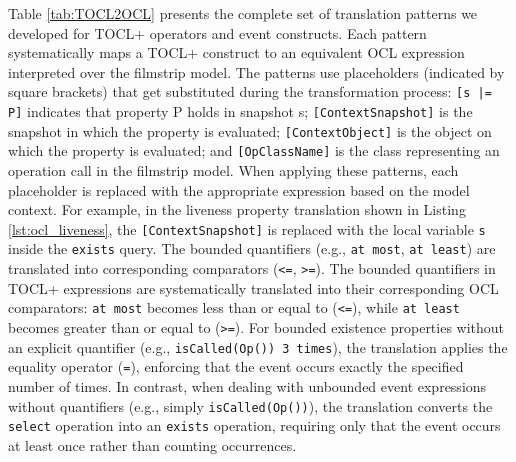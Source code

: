 Table \ref{tab:TOCL2OCL} presents the complete set of translation patterns we 
developed for TOCL+ operators and event constructs. Each pattern systematically 
maps a TOCL+ construct to an equivalent OCL expression interpreted over the filmstrip 
model. The patterns use placeholders (indicated by square brackets) that get 
substituted during the transformation process: \texttt{[s |= P]} indicates that 
property P holds in snapshot s; \texttt{[ContextSnapshot]} is the snapshot in which 
the property is evaluated; \texttt{[ContextObject]} is the object on which the 
property is evaluated; and \texttt{[OpClassName]} is the class representing an 
operation call in the filmstrip model. When applying these patterns, each placeholder 
is replaced with the appropriate expression based on the model context. For example, 
in the liveness property translation shown in Listing \ref{lst:ocl_liveness}, the 
\texttt{[ContextSnapshot]} is replaced with the local variable \texttt{s} inside the 
\texttt{exists} query. The bounded quantifiers (e.g., \texttt{at most}, \texttt{at least}) 
are translated into corresponding comparators (\texttt{<=}, \texttt{>=}). 
The bounded quantifiers in TOCL+ expressions are systematically translated into their 
corresponding OCL comparators: \texttt{at most} becomes less than or equal to 
(\texttt{<=}), while \texttt{at least} becomes greater than or equal to (\texttt{>=}). 
For bounded existence properties without an explicit quantifier (e.g., 
\texttt{isCalled(Op()) 3 times}), the translation applies the equality operator 
(\texttt{=}), enforcing that the event occurs exactly the specified number of times. 
In contrast, when dealing with unbounded event expressions without quantifiers (e.g., 
simply \texttt{isCalled(Op())}), the translation converts the \texttt{select} operation 
into an \texttt{exists} operation, requiring only that the event occurs at least once 
rather than counting occurrences.
    
